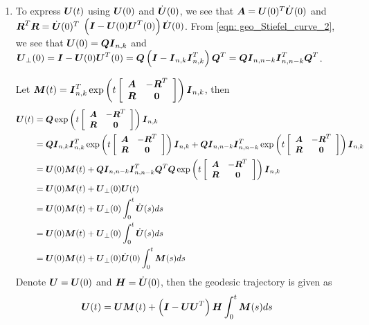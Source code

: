 \documentclass[11pt]{article}
\begin{document}
\begin{enumerate}
\item To express $\boldsymbol{U}(t)$ using $\boldsymbol{U}(0)$ and $\dot{\boldsymbol{U}}(0)$, we see that $\boldsymbol{A} = \boldsymbol{U}(0)^{T} \dot{\boldsymbol{U}}(0)$ and $\boldsymbol{R}^{T} \boldsymbol{R}= \dot{\boldsymbol{U}}(0)^{T} $ $\left( \boldsymbol{I} - \boldsymbol{U}(0)\boldsymbol{U}^{T}(0) \right)  \dot{\boldsymbol{U}}(0)$. From \eqref{eqn: geo_Stiefel_curve_2}, we see that $\boldsymbol{U}(0) = \boldsymbol{Q}\boldsymbol{I}_{n,k}$ and $\boldsymbol{U}_{\bot}(0) = \boldsymbol{I} -\boldsymbol{U}(0) \boldsymbol{U}^{T}(0) = \boldsymbol{Q}\left(\boldsymbol{I} - \boldsymbol{I}_{n,k}\boldsymbol{I}_{n,k}^{T}  \right)\boldsymbol{Q}^{T} = \boldsymbol{Q}\boldsymbol{I}_{n,n-k}\boldsymbol{I}_{n,n-k}^{T}\boldsymbol{Q}^{T} $.

Let $\boldsymbol{M}(t) = \boldsymbol{I}_{n,k}^{T}\exp\left(t\left[\begin{array}{cc}
\boldsymbol{A} & -\boldsymbol{R}^{T} \\ 
\boldsymbol{R}& \boldsymbol{0}
\end{array} \right]\right)\boldsymbol{I}_{n,k}$, then
\begin{align*}
\boldsymbol{U}(t) &= \boldsymbol{Q}\exp\left(t\left[\begin{array}{cc}
\boldsymbol{A} & -\boldsymbol{R}^{T} \\ 
\boldsymbol{R}& \boldsymbol{0}
\end{array} \right]\right)\boldsymbol{I}_{n,k}\\
&=\boldsymbol{Q}\boldsymbol{I}_{n,k}\boldsymbol{I}_{n,k}^{T}\exp\left(t\left[\begin{array}{cc}
\boldsymbol{A} & -\boldsymbol{R}^{T} \\ 
\boldsymbol{R}& \boldsymbol{0}
\end{array} \right]\right)\boldsymbol{I}_{n,k} + \boldsymbol{Q}\boldsymbol{I}_{n,n-k}\boldsymbol{I}_{n,n-k}^{T}\exp\left(t\left[\begin{array}{cc}
\boldsymbol{A} & -\boldsymbol{R}^{T} \\ 
\boldsymbol{R}& \boldsymbol{0}
\end{array} \right]\right)\boldsymbol{I}_{n,k}\\
&= \boldsymbol{U}(0)\boldsymbol{M}(t) +  \boldsymbol{Q}\boldsymbol{I}_{n,n-k}\boldsymbol{I}_{n,n-k}^{T}\boldsymbol{Q}^{T}\boldsymbol{Q}\exp\left(t\left[\begin{array}{cc}
\boldsymbol{A} & -\boldsymbol{R}^{T} \\ 
\boldsymbol{R}& \boldsymbol{0}
\end{array} \right]\right)\boldsymbol{I}_{n,k}\\
&= \boldsymbol{U}(0)\boldsymbol{M}(t) + \boldsymbol{U}_{\bot}(0)\boldsymbol{U}(t)\\
&= \boldsymbol{U}(0)\boldsymbol{M}(t) + \boldsymbol{U}_{\bot}(0)\int_{0}^{t} \dot{\boldsymbol{U}}(s) ds\\
&= \boldsymbol{U}(0)\boldsymbol{M}(t) + \boldsymbol{U}_{\bot}(0)\int_{0}^{t} \dot{\boldsymbol{U}}(s) ds\\
&=\boldsymbol{U}(0)\boldsymbol{M}(t) + \boldsymbol{U}_{\bot}(0)\dot{\boldsymbol{U}}(0)\int_{0}^{t} \boldsymbol{M}(s) ds\\
\end{align*}
Denote $\boldsymbol{U} = \boldsymbol{U}(0)$ and $\boldsymbol{H} = \dot{\boldsymbol{U}}(0)$, then the geodesic trajectory is given as 
\begin{align}
\boldsymbol{U}(t) &= \boldsymbol{U}\boldsymbol{M}(t) +  \left(\boldsymbol{I} - \boldsymbol{U}\boldsymbol{U}^{T}\right)\boldsymbol{H}\int_{0}^{t} \boldsymbol{M}(s) ds \label{eqn: geo_Stiefel_curve_3}
\end{align}


\end{enumerate}
\end{document}
